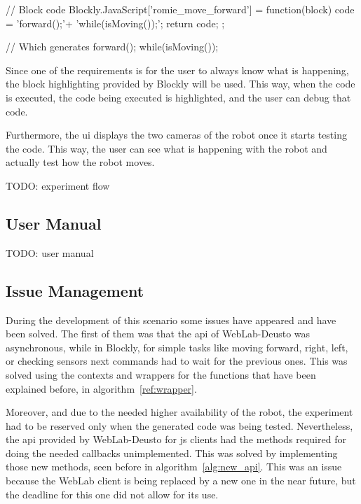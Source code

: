 \begin{center}
\begin{minipage}{.9\textwidth}
\singlespace
{}
\begin{pyglist}[language=javascript, caption={Generated code.},
	label={alg:generated}, listingname={Algorithm}, numbers=left]
// Block code
Blockly.JavaScript['romie_move_forward'] = function(block) {
    code = 'forward();\n'+
            'while(isMoving());\n';
    return code;
};

// Which generates
forward();
while(isMoving());
\end{pyglist}
\end{minipage}
\end{center}

Since one of the requirements is for the user to always know what is happening, the block
highlighting provided by Blockly will be used. This way, when the code is executed, the code being
executed is highlighted, and the user can debug that code.

Furthermore, the \acrlong{ui} displays the two cameras of the robot once it starts testing the code.
This way, the user can see what is happening with the robot and actually test how the robot moves.

TODO: experiment flow

\subsection{User Manual}

TODO: user manual

\subsection{Issue Management}

During the development of this scenario some issues have appeared and have been solved. The first of
them was that the \acrshort{api} of WebLab-Deusto was asynchronous, while in Blockly, for simple
tasks like moving forward, right, left, or checking sensors next commands had to wait for the
previous ones. This was solved using the contexts and wrappers for the functions that have been
explained before, in algorithm~\ref{ref:wrapper}.

Moreover, and due to the needed higher availability of the robot, the experiment had to be reserved
only when the generated code was being tested. Nevertheless, the \acrshort{api} provided by
WebLab-Deusto for \acrlong{js} clients had the methods required for doing the needed callbacks
unimplemented. This was solved by implementing those new methods, seen before in
algorithm~\ref{alg:new_api}. This was an issue because the WebLab client is being replaced by a new
one in the near future, but the deadline for this one did not allow for its use.
